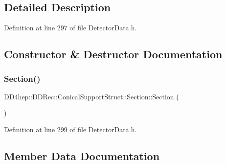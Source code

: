 \subsection{Detailed Description}


Definition at line 297 of file Detector\+Data.\+h.



\subsection{Constructor \& Destructor Documentation}
\hypertarget{struct_d_d4hep_1_1_d_d_rec_1_1_conical_support_struct_1_1_section_a01a1dcdce026423d946fae269b6a99de}{}\label{struct_d_d4hep_1_1_d_d_rec_1_1_conical_support_struct_1_1_section_a01a1dcdce026423d946fae269b6a99de} 
\subsubsection{\texorpdfstring{Section()}{Section()}}
{\footnotesize\ttfamily D\+D4hep\+::\+D\+D\+Rec\+::\+Conical\+Support\+Struct\+::\+Section\+::\+Section (\begin{DoxyParamCaption}{ }\end{DoxyParamCaption})\hspace{0.3cm}{\ttfamily [inline]}}



Definition at line 299 of file Detector\+Data.\+h.



\subsection{Member Data Documentation}
\hypertarget{struct_d_d4hep_1_1_d_d_rec_1_1_conical_support_struct_1_1_section_a9affb6ab8e0306b5c87a794adede9c32}{}\label{struct_d_d4hep_1_1_d_d_rec_1_1_conical_support_struct_1_1_section_a9affb6ab8e0306b5c87a794adede9c32} 
